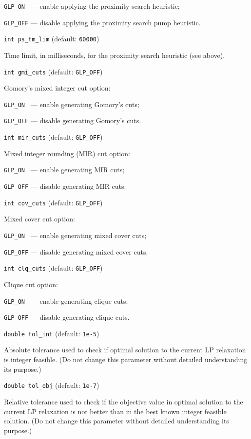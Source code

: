 \verb|GLP_ON | --- enable applying the proximity search heuristic;

\verb|GLP_OFF| --- disable applying the proximity search pump heuristic.

\bigskip

{\tt int ps\_tm\_lim} (default: {\tt 60000})

Time limit, in milliseconds, for the proximity search heuristic (see
above).

\bigskip

{\tt int gmi\_cuts} (default: {\tt GLP\_OFF})

Gomory's mixed integer cut option:

\verb|GLP_ON | --- enable generating Gomory's cuts;

\verb|GLP_OFF| --- disable generating Gomory's cuts.

\bigskip

{\tt int mir\_cuts} (default: {\tt GLP\_OFF})

Mixed integer rounding (MIR) cut option:

\verb|GLP_ON | --- enable generating MIR cuts;

\verb|GLP_OFF| --- disable generating MIR cuts.

\bigskip

{\tt int cov\_cuts} (default: {\tt GLP\_OFF})

Mixed cover cut option:

\verb|GLP_ON | --- enable generating mixed cover cuts;

\verb|GLP_OFF| --- disable generating mixed cover cuts.

\bigskip

{\tt int clq\_cuts} (default: {\tt GLP\_OFF})

Clique cut option:

\verb|GLP_ON | --- enable generating clique cuts;

\verb|GLP_OFF| --- disable generating clique cuts.

\bigskip

{\tt double tol\_int} (default: {\tt 1e-5})

Absolute tolerance used to check if optimal solution to the current LP
relaxation is integer feasible. (Do not change this parameter without
detailed understanding its purpose.)

\newpage

{\tt double tol\_obj} (default: {\tt 1e-7})

Relative tolerance used to check if the objective value in optimal
solution to the current LP relaxation is not better than in the best
known integer feasible solution. (Do not change this parameter without
detailed understanding its purpose.)

